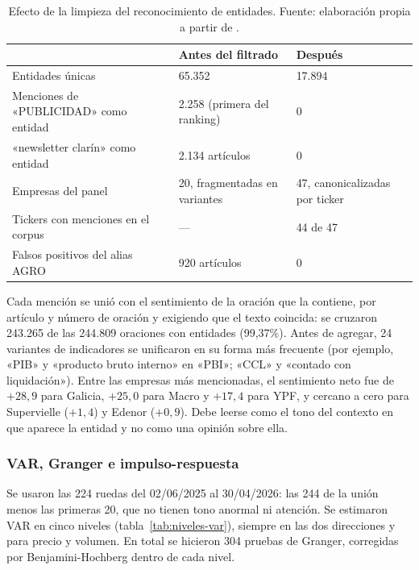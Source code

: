 \begin{table}[H]
\centering\footnotesize
\begin{tabular}{@{}lll@{}}
\toprule
 & \textbf{Antes del filtrado} & \textbf{Después} \\
\midrule
Entidades únicas & 65.352 & 17.894 \\
Menciones de «PUBLICIDAD» como entidad & 2.258 (primera del ranking) & 0 \\
«newsletter clarín» como entidad & 2.134 artículos & 0 \\
Empresas del panel & 20, fragmentadas en variantes & 47, canonicalizadas por ticker \\
Tickers con menciones en el corpus & — & 44 de 47 \\
Falsos positivos del alias AGRO & 920 artículos & 0 \\
\bottomrule
\end{tabular}
\caption{Efecto de la limpieza del reconocimiento de entidades. Fuente: elaboración propia a
partir de .}
\label{tab:ner}
\end{table}

Cada mención se unió con el sentimiento de la oración que la contiene, por artículo y número
de oración y exigiendo que el texto coincida: se cruzaron 243.265 de las 244.809 oraciones con
entidades (99,37\%). Antes de agregar, 24 variantes de indicadores se unificaron en su forma
más frecuente (por ejemplo, «PIB» y «producto bruto interno» en «PBI»; «CCL» y «contado con
liquidación»). Entre las empresas más mencionadas, el sentimiento neto fue de $+28{,}9$ para
Galicia, $+25{,}0$ para Macro y $+17{,}4$ para YPF, y cercano a cero para Supervielle
($+1{,}4$) y Edenor ($+0{,}9$). Debe leerse como el tono del contexto en que aparece la
entidad y no como una opinión sobre ella.

\subsubsection{VAR, Granger e impulso-respuesta}

Se usaron las 224 ruedas del 02/06/2025 al 30/04/2026: las 244 de la unión menos las primeras
20, que no tienen tono anormal ni atención. Se estimaron VAR en cinco niveles
(tabla~\ref{tab:niveles-var}), siempre en las dos direcciones y para precio y volumen. En
total se hicieron 304 pruebas de Granger, corregidas por Benjamini-Hochberg dentro de cada
nivel.

